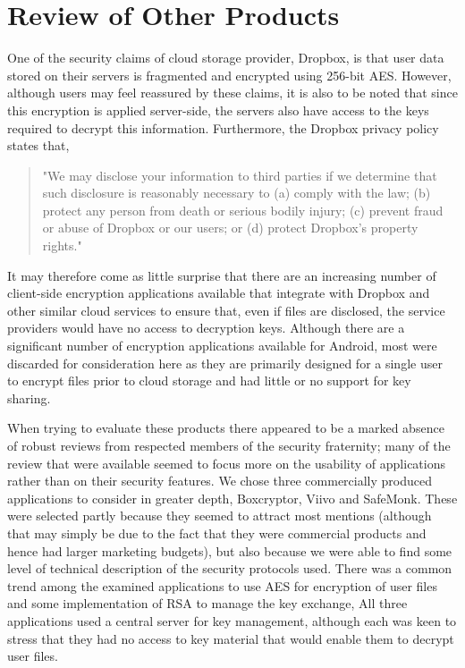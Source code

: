\section{Review of Other Products}
\label{sec:other}
One of the security claims of cloud storage provider, Dropbox, is that user data stored on their servers is  fragmented and encrypted using 256-bit AES.  However, although users may feel reassured by these claims, it is also to be noted that since this encryption is applied server-side, the servers also have access to the keys required to decrypt this information.  Furthermore, the   Dropbox privacy policy states that,  
\begin{quotation}
"We may disclose your information to third parties if we determine that such disclosure is reasonably necessary to (a) comply with the law; (b) protect any person from death or serious bodily injury; (c) prevent fraud or abuse of Dropbox or our users; or (d) protect Dropbox's property rights." 
\end{quotation} 

It may therefore come as little surprise that there are an increasing  number of client-side encryption applications available that  integrate with Dropbox and other similar cloud services  to ensure that, even if files are disclosed, the service providers would have no access to decryption keys.
Although there are a significant number of encryption applications available for Android, most were discarded for consideration here as they are primarily designed for a single user to encrypt files prior to cloud storage and had little or no support for key sharing.  

When trying to evaluate these products there appeared to be a marked absence of robust reviews from respected members of the security fraternity; many of the review that were available seemed to focus more on the usability of applications rather than on their security features.  We chose three commercially produced applications to consider in greater depth, Boxcryptor, Viivo and SafeMonk.  These were selected partly because they seemed to attract most mentions (although that may simply be due to the fact that they were commercial products and hence had larger marketing budgets), but also because we were able to find some level of technical description of the security protocols used.  There was a common trend among the examined applications to use AES for encryption of user files and some implementation of RSA to manage the key exchange, All three applications used a central server  for key management, although each was keen to stress that they had no access to key material that would enable them to decrypt user files. 


